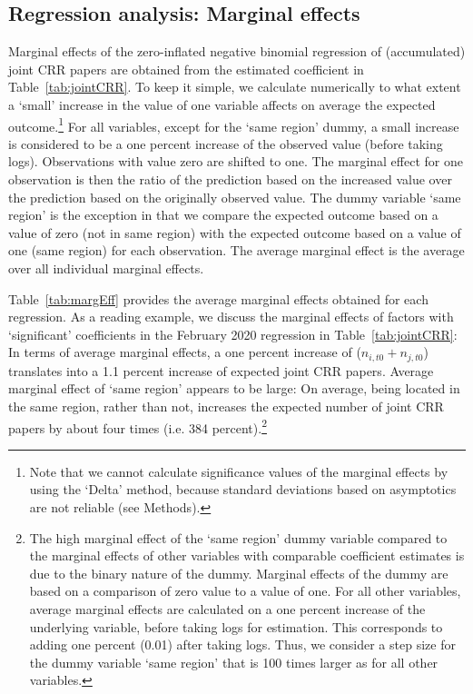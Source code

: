 \subsection{Regression analysis: Marginal effects}
\label{sec:MargEffects}


Marginal effects of the zero-inflated negative binomial regression of (accumulated) joint CRR papers are obtained from the estimated coefficient in Table~\ref{tab:jointCRR}. To keep it simple, we calculate numerically to what extent a `small' increase in the value of one variable affects on average the expected outcome.\footnote{Note that we cannot calculate significance values of the marginal effects by using the `Delta' method, because standard deviations based on asymptotics are not reliable (see Methods).} For all variables, except for the `same region' dummy, a small increase is considered to be a one percent increase of the observed value (before taking logs). Observations with value zero are shifted to one. The marginal effect for one observation is then the ratio of the prediction based on the increased value over the prediction based on the originally observed value.  The dummy variable `same region' is the exception in that we compare the expected outcome based on a value of zero (not in same region) with the expected outcome based on a value of one (same region) for each observation. The average marginal effect is the average over all individual marginal effects. 

Table~\ref{tab:margEff} provides the average marginal effects obtained for each regression. As a reading example, we discuss the marginal effects of factors with `significant' coefficients in the February 2020 regression in Table~\ref{tab:jointCRR}: In terms of average marginal effects, a one percent increase of ($n_{i,t0} + n_{j,t0}$) translates into a 1.1 percent increase of expected joint CRR papers. Average marginal effect of `same region' appears to be large: On average, being located in the same region, rather than not, increases the expected number of joint CRR papers by about four times (i.e. 384 percent).\footnote{The high marginal effect of the `same region' dummy variable compared to the marginal effects of other variables with comparable coefficient estimates is due to the binary nature of the dummy. Marginal effects of the dummy are based on a comparison of zero value to a value of one. For all other variables, average marginal effects are calculated on a one percent increase of the underlying variable, before taking logs for estimation. This corresponds to adding one percent (0.01) after taking logs. Thus, we consider a step size for the dummy variable `same region' that is 100 times larger as for all other variables.}


